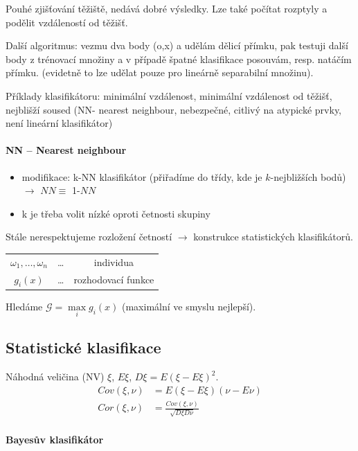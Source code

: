 Pouhé zjišťování těžiště, nedává dobré výsledky. Lze také počítat rozptyly a podělit vzdáleností od těžišť.


Další algoritmus: vezmu dva body (o,x) a udělám dělicí přímku, pak testuji další body z trénovací množiny
a v případě špatné klasifikace posouvám, resp. natáčím přímku. (evidetně to lze udělat pouze pro lineárně separabilní
množinu).

Příklady klasifikátoru: minimální vzdálenost, minimální vzdálenost od těžišť, nejblišží soused (NN- nearest neighbour,
nebezpečné, citlivý na atypické prvky, není lineární klasifikátor)

\paragraph{NN -- Nearest neighbour}
\begin{itemize}
	\item modifikace: k-NN klasifikátor (přiřadíme do třídy, kde je $k$-nejbližších bodů) $\rightarrow$ $NN\equiv$ 1-$NN$
	\item k je třeba volit nízké oproti četnosti skupiny
\end{itemize}

Stále nerespektujeme rozložení četností $\rightarrow$ konstrukce statistických klasifikátorů.

\begin{tabular}{ccc}
	$\omega_1,\dots,\omega_n$ &\dots& individua\\
	$g_i(x)$ &\dots& rozhodovací funkce
\end{tabular}

Hledáme $\mathcal{G}=\max\limits_i g_i(x)$ (maximální ve smyslu nejlepší).

\subsection{Statistické klasifikace}

Náhodná veličina (NV) $\xi$, $E\xi$, $D\xi=E\left(\xi-E\xi\right)^2$.
\begin{align}
Cov(\xi,\nu) &= E(\xi-E\xi)(\nu-E\nu)\\
Cor(\xi,\nu) &= \frac{Cov(\xi,\nu)}{\sqrt{D\xi D\nu}}
\end{align}

\paragraph{Bayesův klasifikátor}

